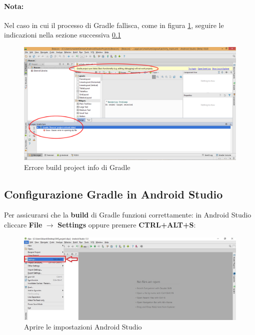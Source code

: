 \documentclass[../ManualeSviluppatore.tex]{subfiles}
\begin{document}
		\paragraph*{Nota:}
			Nel caso in cui il processo di Gradle fallisca, come in figura \ref{fig:GradleError}, seguire le indicazioni nella sezione successiva \ref{subsec:ConfigGradleAS}
			
		\begin{figure} [h]
			\centering
			\includegraphics[width=\textwidth]{img/GradleError}
			\caption{Errore build project info di Gradle}
			\label{fig:GradleError}
		\end{figure}
		
		\newpage
		\subsection{Configurazione Gradle in \gls{Android} Studio}
		\label{subsec:ConfigGradleAS}
			Per assicurarsi che la \textbf{build} di Gradle funzioni correttamente: in \gls{Android Studio} cliccare \textbf{File} $\rightarrow$ \textbf{Settings} oppure premere \textbf{CTRL+ALT+S}:
			
		
		\begin{figure} [h]
			\centering
			\includegraphics[width=\textwidth]{img/settings}
			\caption{Aprire le impostazioni \gls{Android} Studio}
			\label{fig:Settings}
		\end{figure}
		
\end{document}
